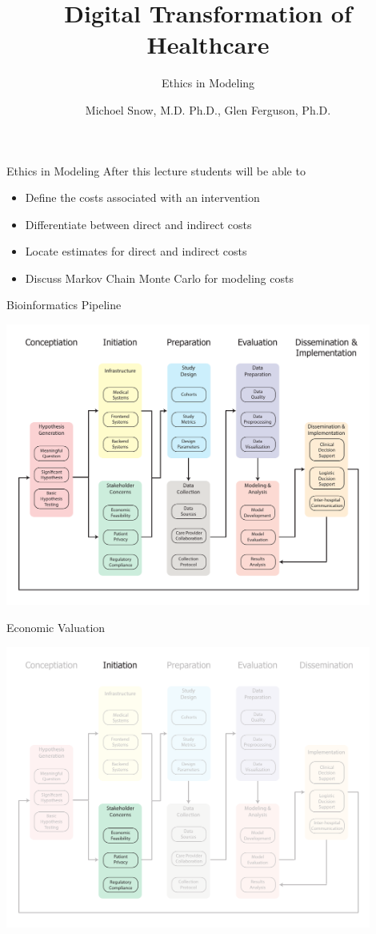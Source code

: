 \documentclass[10pt, xcolor=table]{beamer}
\title{Digital Transformation of Healthcare}
\subtitle{Ethics in Modeling}
\date{}
\author{Michoel Snow, M.D. Ph.D., Glen Ferguson, Ph.D.}
\institute{Center for Health Data Innovations}
\begin{document}
\maketitle


\begin{frame}{Ethics in Modeling}
	After this lecture students will be able to 
	\begin{itemize}
		\item Define the costs associated with an intervention
		\item Differentiate between direct and indirect costs 
		\item Locate estimates for direct and indirect costs
		\item Discuss Markov Chain Monte Carlo for modeling costs
	\end{itemize}
\end{frame}


\begin{frame}{Bioinformatics Pipeline}
	\begin{center}
		\includegraphics[width=0.9\textwidth]{images/informatics_pipeline.pdf}	
	\end{center}
\end{frame}


\begin{frame}{Economic Valuation}
	\begin{center}
		\includegraphics[width=0.9\textwidth]{images/informatics_pipeline_model_ethics.pdf}	
	\end{center}
\end{frame}
\end{document}
